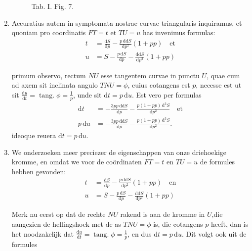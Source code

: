\documentclass[10pt,a4paper]{article}
\newcommand{\switchenum}{\setcounter{enumi}{\arabic{enumi}-1}\switchcolumn}
\DeclareMathOperator{\tang}{tang.}
\def\D{\mathrm{d}}
\begin{document}
\begin{paracol}{2}
\begin{enumerate}[topsep=1px]
\begin{figure}[h]
{}
			\selectfont
			\caption{Tab. I. Fig. 7.}
		\end{figure}

		\switchcolumn*
		\newpage
		
		\item Accuratius autem in symptomata nostrae curvae triangularis inquiramus, et quoniam pro coordinatis $FT=t$ et $TU=u$ has invenimus formulas:
		\begin{align*}
			t & = \frac{\D S}{\D p}-\frac{p\,\D \D S}{\D p^2}(1+pp)\quad\text{et}\\
			u & = S-\frac{p\,\D S}{\D p}-\frac{\D\D S}{\D p^2}(1+pp)
		\end{align*}
		\par primum observo, rectum $NU$ esse tangentem curvae in punctu $U$, quae cum ad axem sit inclinata angulo $TNU=\phi$, cuius cotangens est $p$, necesse est ut sit $\frac{\D u}{\D t} = \tang \phi = \frac{1}{p}$, unde sit $\D t = p\, \D u$. Est vero per formulas
		\begin{align*}
			\D t &= -\frac{3pp\, \D\D S}{\D p}-\frac{p(1+pp)\, \D^3S}{\D p^2} \quad \text{et}\\
			p\, \D u &= - \frac{3pp \, \D \D S}{\D p} - \frac{p(1+pp)\, \D^3S}{\D p^2}.
		\end{align*}
		ideoque reuera $\D t=p\, \D u$.
		
		\switchenum
		\newpage
		
		\item We onderzoeken meer preciezer de eigenschappen van onze driehoekige kromme, en omdat we voor de coördinaten $FT=t$ en $TU=u$ de formules hebben gevonden:
		\begin{align*}
			t & = \frac{\D S}{\D p}-\frac{p\,\D \D S}{\D p^2}(1+pp)\quad\text{en}\\
			u & = S-\frac{p\,\D S}{\D p}-\frac{\D\D S}{\D p^2}(1+pp)
		\end{align*}
		\par Merk nu eerst op dat de rechte $NU$ rakend is aan de kromme in $U$,die aangezien de hellingshoek met de as $TNU=\phi$ is, die cotangens $p$ heeft, dan is het noodzakelijk dat $\frac{\D u}{\D t} = \tang \phi = \frac{1}{p}$, en dus $\D t = p \, \D u$. Dit volgt ook uit de formules 


\end{enumerate}
\end{paracol}
\end{document}
